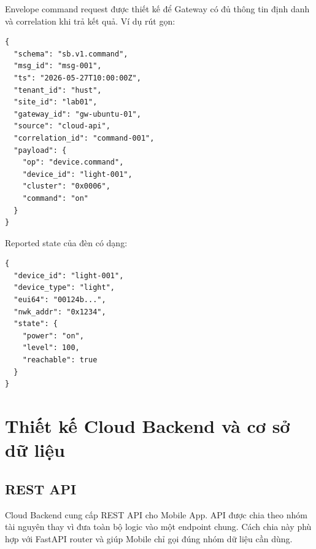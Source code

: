 Envelope command request được thiết kế để Gateway có đủ thông tin định danh và correlation khi trả kết quả. Ví dụ rút gọn:

\begin{lstlisting}[caption={Ví dụ MQTT command envelope},label={lst:ch3-command-envelope}]
{
  "schema": "sb.v1.command",
  "msg_id": "msg-001",
  "ts": "2026-05-27T10:00:00Z",
  "tenant_id": "hust",
  "site_id": "lab01",
  "gateway_id": "gw-ubuntu-01",
  "source": "cloud-api",
  "correlation_id": "command-001",
  "payload": {
    "op": "device.command",
    "device_id": "light-001",
    "cluster": "0x0006",
    "command": "on"
  }
}
\end{lstlisting}

Reported state của đèn có dạng:

\begin{lstlisting}[caption={Ví dụ reported state của thiết bị đèn},label={lst:ch3-light-reported}]
{
  "device_id": "light-001",
  "device_type": "light",
  "eui64": "00124b...",
  "nwk_addr": "0x1234",
  "state": {
    "power": "on",
    "level": 100,
    "reachable": true
  }
}
\end{lstlisting}

\section{Thiết kế Cloud Backend và cơ sở dữ liệu}
\label{sec:ch3-cloud-db}

\subsection{REST API}
\label{sec:ch3-rest-api}

Cloud Backend cung cấp REST API cho Mobile App. API được chia theo nhóm tài nguyên thay vì đưa toàn bộ logic vào một endpoint chung. Cách chia này phù hợp với FastAPI router và giúp Mobile chỉ gọi đúng nhóm dữ liệu cần dùng.

